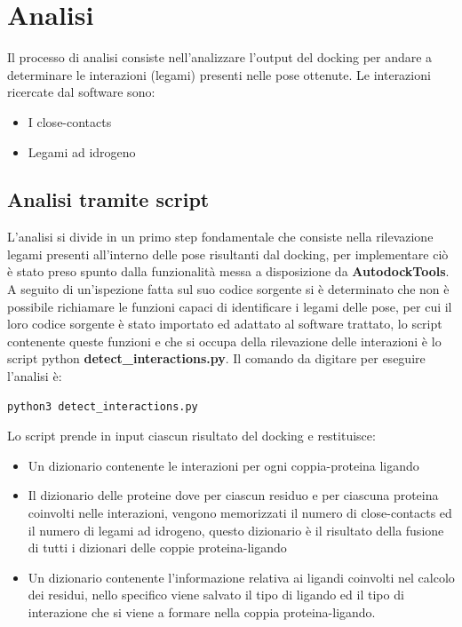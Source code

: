 \section{Analisi}
Il processo di analisi consiste nell'analizzare l'output del docking per andare a determinare le interazioni (legami) presenti nelle pose ottenute. Le interazioni ricercate dal software sono:

\begin{itemize}
    \item I close-contacts
    \item Legami ad idrogeno
\end{itemize}


\subsection{Analisi tramite script}
L'analisi si divide in un primo step fondamentale che consiste nella rilevazione legami presenti all'interno delle pose risultanti dal docking, per implementare ciò è stato preso spunto dalla funzionalità messa a disposizione da \textbf{AutodockTools}. A seguito di un'ispezione fatta sul suo codice sorgente si è determinato che non è possibile richiamare le funzioni capaci di identificare i legami delle pose, per cui il loro codice sorgente è stato importato ed adattato al software trattato, lo script contenente queste funzioni e che si occupa della rilevazione delle interazioni è lo script python \textbf{detect\_interactions.py}.\newline
Il comando da digitare per eseguire l'analisi è:

\begin{lstlisting}[language=bash, label=lst:code31, caption={Comando per eseguire l'analisi}]
python3 detect_interactions.py
\end{lstlisting}

Lo script prende in input ciascun risultato del docking e restituisce: 

\begin{itemize}
    \item Un dizionario contenente le interazioni per ogni coppia-proteina ligando
    \item Il dizionario delle proteine dove per ciascun residuo e per ciascuna proteina coinvolti nelle interazioni, vengono memorizzati il numero di close-contacts ed il numero di legami ad idrogeno, questo dizionario è il risultato della fusione di tutti i dizionari delle coppie proteina-ligando
    \item Un dizionario contenente l'informazione relativa ai ligandi coinvolti nel calcolo dei residui, nello specifico viene salvato il tipo di ligando ed il tipo di interazione che si viene a formare nella coppia proteina-ligando. 
\end{itemize}

